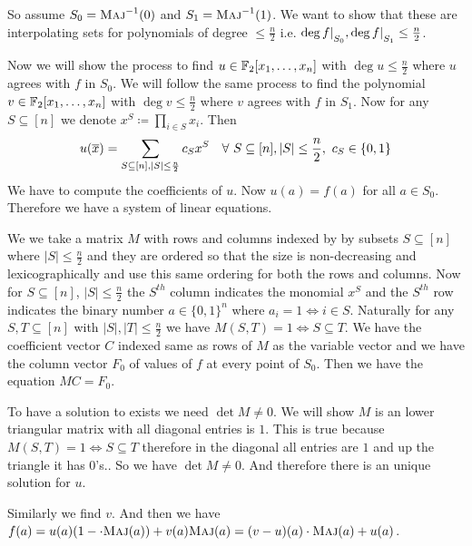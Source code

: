 \begin{proof-of-theorem}
	So assume $S_0=\textsc{Maj}^{-1}(0)$ and $S_1=\textsc{Maj}^{-1}(1)$. We want to show that these are interpolating sets for polynomials of degree $\leq \frac{n}{2}$ i.e. $\deg f|\strut_{S_0},\deg f|\strut_{S_1}\leq \frac{n}{2}$. 
	
	Now we will show the process to find $u\in\mathbb{F}_2[x_1,\dots, x_n]$ with $\deg u\leq \frac{n}{2}$ where $u$ agrees with $f$ in $S_0$. We will follow the same process to find the polynomial $v\in\mathbb{F}_2[x_1,\dots, x_n]$ with $\deg v\leq \frac{n}{2}$ where $v$ agrees with $f$ in $S_1$. Now for any $S\subseteq [n]$ we denote $x^S\coloneqq \prod\limits_{i\in S}x_i$. Then $$u(\ovx)=\sum_{S\subseteq[n], |S|\leq \frac{n}{2}}c_Sx^S\quad \forall \ S\subseteq[n],|S|\leq\frac{n}{2},\  c_S\in\{0,1\}$$We have to compute the coefficients of $u$. Now $u(a)=f(a)$ for all $a\in S_0$. Therefore we have a system of linear equations. 
	
	We we take a matrix $M$ with rows and columns indexed by by subsets $S\subseteq [n]$ where $|S|\leq\frac{n}{2}$ and they are ordered so that the size is non-decreasing and lexicographically and use this same ordering for both the rows and columns. Now for $S\subseteq [n]$, $|S|\leq \frac{n}{2}$ the $S^{th}$ column indicates the monomial $x^S$ and the $S^{th}$ row indicates the binary number $a\in\{0,1\}^n$ where $a_i=1\iff i\in S$. Naturally for any $S,T\subseteq [n]$ with $|S|,|T|\leq\frac{n}2$ we have $M(S,T) =1\iff S\subseteq T$. We have the coefficient vector $C$ indexed same as rows of $M$ as the variable vector and we have the column vector $F_0$ of values of $f$ at every point of $S_0$. Then we have the equation $MC=F_0$. 
	
	To have a solution to exists we need $\det M\neq0$. We will show $M$ is an lower triangular matrix with all diagonal entries is $1$. This is true because $M(S,T)=1\iff S\subseteq T$ therefore in the diagonal all entries are $1$ and up the triangle it has $0$'s.. So we have $\det M\neq 0$. And therefore there is an unique solution for $u$. 
	
	Similarly we find $v$. And then we have $f(a)=u(a)(1-\cdot\textsc{Maj}(a))+v(a)\textsc{Maj}(a)=(v-u)(a)\cdot \textsc{Maj}(a)+u(a)$. 
\end{proof-of-theorem}